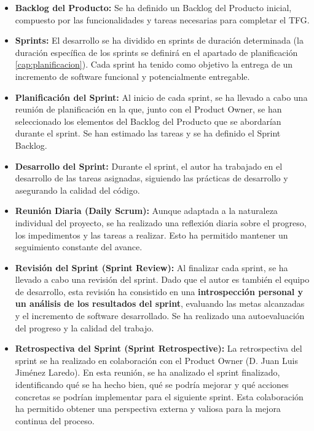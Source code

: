 \begin{itemize}
    \item \textbf{Backlog del Producto:} Se ha definido un Backlog del Producto inicial, compuesto por las funcionalidades y tareas necesarias para completar el TFG.
    \item \textbf{Sprints:} El desarrollo se ha dividido en sprints de duración determinada (la duración específica de los sprints se definirá en el apartado de planificación \ref{cap:planificacion}). Cada sprint ha tenido como objetivo la entrega de un incremento de software funcional y potencialmente entregable.
    \item \textbf{Planificación del Sprint:} Al inicio de cada sprint, se ha llevado a cabo una reunión de planificación en la que, junto con el Product Owner, se han seleccionado los elementos del Backlog del Producto que se abordarían durante el sprint. Se han estimado las tareas y se ha definido el Sprint Backlog.
    \item \textbf{Desarrollo del Sprint:} Durante el sprint, el autor ha trabajado en el desarrollo de las tareas asignadas, siguiendo las prácticas de desarrollo y asegurando la calidad del código.
    \item \textbf{Reunión Diaria (Daily Scrum):} Aunque adaptada a la naturaleza individual del proyecto, se ha realizado una reflexión diaria sobre el progreso, los impedimentos y las tareas a realizar. Esto ha permitido mantener un seguimiento constante del avance.
    \item \textbf{Revisión del Sprint (Sprint Review):} Al finalizar cada sprint, se ha llevado a cabo una revisión del sprint. Dado que el autor es también el equipo de desarrollo, esta revisión ha consistido en una \textbf{introspección personal y un análisis de los resultados del sprint}, evaluando las metas alcanzadas y el incremento de software desarrollado. Se ha realizado una autoevaluación del progreso y la calidad del trabajo.
    \item \textbf{Retrospectiva del Sprint (Sprint Retrospective):} La retrospectiva del sprint se ha realizado en colaboración con el Product Owner (D. Juan Luis Jiménez Laredo). En esta reunión, se ha analizado el sprint finalizado, identificando qué se ha hecho bien, qué se podría mejorar y qué acciones concretas se podrían implementar para el siguiente sprint. Esta colaboración ha permitido obtener una perspectiva externa y valiosa para la mejora continua del proceso.
\end{itemize}

